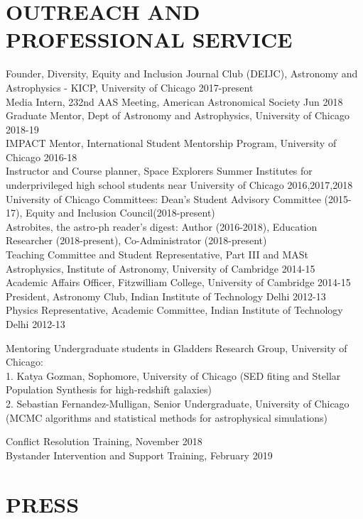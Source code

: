 \documentclass[margin]{res}
\begin{document}
\begin{resume}
\section{OUTREACH AND PROFESSIONAL SERVICE}
Founder, Diversity, Equity and Inclusion Journal Club (DEIJC), Astronomy and Astrophysics - KICP, University of Chicago \hfill 2017-present\\
Media Intern, 232nd AAS Meeting, American Astronomical Society \hfill Jun 2018\\
Graduate Mentor, Dept of Astronomy and Astrophysics, University of Chicago \hfill 2018-19\\
IMPACT Mentor, International Student Mentorship Program, University of Chicago \hfill 2016-18\\
Instructor and Course planner, Space Explorers Summer Institutes for underprivileged high school students near University of Chicago \hfill 2016,2017,2018\\
University of Chicago Committees: Dean's Student Advisory Committee (2015-17), Equity and Inclusion Council(2018-present)\\
Astrobites, the astro-ph reader's digest: Author (2016-2018), Education Researcher (2018-present), Co-Administrator (2018-present)\\
Teaching Committee and Student Representative, Part III and MASt Astrophysics, Institute of Astronomy, University of Cambridge \hfill 2014-15\\
Academic Affairs Officer, Fitzwilliam College, University of Cambridge \hfill 2014-15\\
President, Astronomy Club, Indian Institute of Technology Delhi \hfill 2012-13\\
Physics Representative, Academic Committee, Indian Institute of Technology Delhi \hfill 2012-13

Mentoring Undergraduate students in Gladders Research Group, University of Chicago:\\
1. Katya Gozman, Sophomore, University of Chicago (SED fiting and Stellar Population Synthesis for high-redshift galaxies)\\
2. Sebastian Fernandez-Mulligan, Senior Undergraduate, University of Chicago (MCMC algorithms and statistical methods for astrophysical simulations)

Conflict Resolution Training, November 2018\\
Bystander Intervention and Support Training, February 2019


\section{PRESS}


\end{resume}
\end{document}
